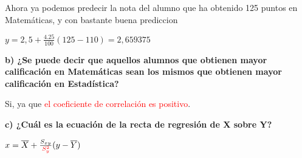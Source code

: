 \documentclass{article}
\begin{document}
Ahora ya podemos predecir la nota del alumno que ha obtenido 125 puntos en Matem\'aticas, y con bastante buena prediccion

\(y = 2,5 + \frac{4.25}{100} (125 - 110) = 2,659375\)

\textbf{b) ¿Se puede decir que aquellos alumnos que obtienen mayor calificaci\'on en Matem\'aticas sean los mismos que obtienen mayor calificaci\'on en Estad\'istica?}

Si, ya que \textcolor{red}{el coeficiente de correlaci\'on es positivo}.

\textbf{c) ¿Cu\'al es la ecuaci\'on de la recta de regresi\'on de X sobre Y?}

\(x = \overline{X} + \frac{S_{xy}}{\textcolor{red}{S_{y}^2}} (y - \overline{Y})\)
\end{document}

